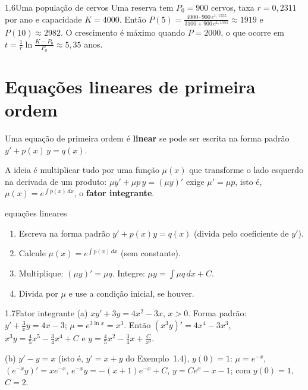 \begin{exemplo}{1.6}{Uma população de cervos}
Uma reserva tem $P_0=900$ cervos, taxa $r=0{,}2311$ por ano e capacidade $K=4000$. Então
$P(5)=\frac{4000\cdot900\,e^{1{,}1555}}{3100+900\,e^{1{,}1555}}\approx1919$ e
$P(10)\approx2982$. O crescimento é máximo quando $P=2000$, o que ocorre em
$t=\frac1r\ln\frac{K-P_0}{P_0}\approx5{,}35$ anos.
\end{exemplo}

\section{Equações lineares de primeira ordem}

\begin{definicao}
Uma equação de primeira ordem é \textbf{linear} se
pode ser escrita na forma padrão $y'+p(x)\,y=q(x)$.
\end{definicao}

A ideia é multiplicar tudo por uma função $\mu(x)$ que transforme o lado esquerdo na
derivada de um produto: $\mu y'+\mu p\,y=(\mu y)'$ exige $\mu'=\mu p$, isto é,
$\mu(x)=e^{\int p(x)\,dx}$, o \textbf{fator integrante}.

\begin{estrategia}{equações lineares}
\begin{enumerate}[label=\arabic*.]
\item Escreva na forma padrão $y'+p(x)y=q(x)$ (divida pelo coeficiente de $y'$).
\item Calcule $\mu(x)=e^{\int p(x)\,dx}$ (sem constante).
\item Multiplique: $(\mu y)'=\mu q$. Integre: $\mu y=\int\mu q\,dx+C$.
\item Divida por $\mu$ e use a condição inicial, se houver.
\end{enumerate}
\end{estrategia}

\begin{exemplo}{1.7}{Fator integrante}
(a) $xy'+3y=4x^2-3x$, $x>0$. Forma padrão: $y'+\frac3xy=4x-3$; $\mu=e^{3\ln x}=x^3$. Então
$(x^3y)'=4x^4-3x^3$, $x^3y=\frac45x^5-\frac34x^4+C$ e
$y=\frac45x^2-\frac34x+\frac C{x^3}$.

(b) $y'-y=x$ (isto é, $y'=x+y$ do Exemplo~1.4), $y(0)=1$: $\mu=e^{-x}$,
$(e^{-x}y)'=xe^{-x}$, $e^{-x}y=-(x+1)e^{-x}+C$, $y=Ce^x-x-1$; com $y(0)=1$, $C=2$.
\end{exemplo}


